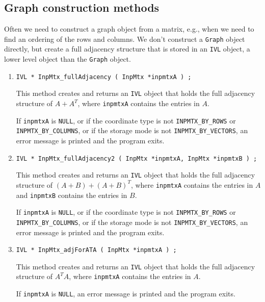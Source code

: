 \subsection{Graph construction methods}
\label{subsection:InpMtx:proto:construct}
\par
Often we need to construct a graph object from a matrix, e.g.,
when we need to find an ordering of the rows and columns.
We don't construct a {\tt Graph} object directly, but create a full
adjacency structure that is stored in an {\tt IVL} object, a lower
level object than the {\tt Graph} object.
\par
\begin{enumerate}
\item
\begin{verbatim}
IVL * InpMtx_fullAdjacency ( InpMtx *inpmtxA ) ;
\end{verbatim}
This method creates and returns an {\tt IVL} object that holds the
full adjacency structure of $A + A^T$, where {\tt inpmtxA} contains
the entries in $A$.
\par {}
If {\tt inpmtxA} is {\tt NULL},
or if the coordinate type is not 
{\tt INPMTX\_BY\_ROWS} or {\tt INPMTX\_BY\_COLUMNS},
or if the storage mode is not {\tt INPMTX\_BY\_VECTORS},
an error message is printed and the program exits.
\item
\begin{verbatim}
IVL * InpMtx_fullAdjacency2 ( InpMtx *inpmtxA, InpMtx *inpmtxB ) ;
\end{verbatim}
This method creates and returns an {\tt IVL} object that holds the
full adjacency structure of $(A + B) + (A + B)^T$, 
where {\tt inpmtxA} contains the entries in $A$
and {\tt inpmtxB} contains the entries in $B$.
\par {}
If {\tt inpmtxA} is {\tt NULL},
or if the coordinate type is not 
{\tt INPMTX\_BY\_ROWS} or {\tt INPMTX\_BY\_COLUMNS},
or if the storage mode is not {\tt INPMTX\_BY\_VECTORS},
an error message is printed and the program exits.
\item
\begin{verbatim}
IVL * InpMtx_adjForATA ( InpMtx *inpmtxA ) ;
\end{verbatim}
This method creates and returns an {\tt IVL} object that holds the
full adjacency structure of $A^T A$, where {\tt inpmtxA} contains
the entries in $A$.
\par {}
If {\tt inpmtxA} is {\tt NULL},
an error message is printed and the program exits.
\end{enumerate}
